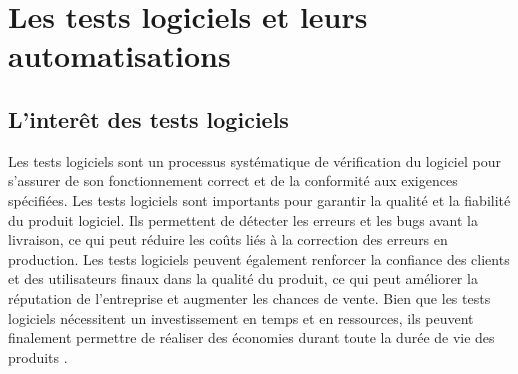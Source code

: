 \chapter{Les tests logiciels et leurs automatisations}
\thispagestyle{fancy}

\section{L'interêt des tests logiciels}
\label{sec:interet}
Les tests logiciels sont un processus systématique de vérification du logiciel pour s'assurer de son fonctionnement correct et de la conformité aux exigences spécifiées.
Les tests logiciels sont importants pour garantir la qualité et la fiabilité du produit logiciel. Ils permettent de détecter les erreurs et les bugs avant la livraison, ce qui peut réduire les coûts liés à la correction des erreurs en production. Les tests logiciels peuvent également renforcer la confiance des clients et des utilisateurs finaux dans la qualité du produit, ce qui peut améliorer la réputation de l'entreprise et augmenter les chances de vente. Bien que les tests logiciels nécessitent un investissement en temps et en ressources, ils peuvent finalement permettre de réaliser des économies durant toute la durée de vie des produits \parencite{interet}.

